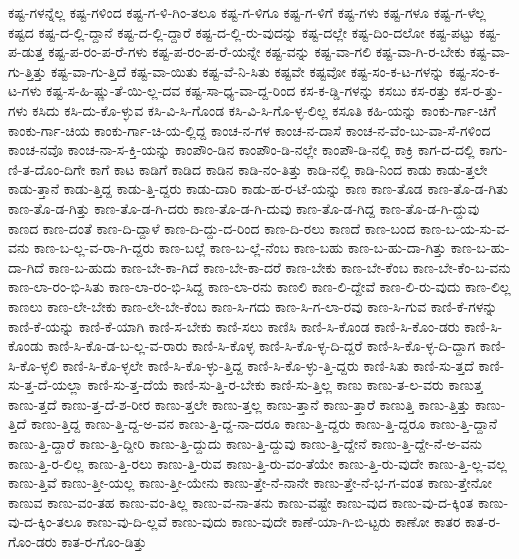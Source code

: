 {ಕಷ್ಟ-ಗಳನ್ನೆಲ್ಲ
ಕಷ್ಟ-ಗಳಿಂದ
ಕಷ್ಟ-ಗ-ಳಿ-ಗಿಂ-ತಲೂ
ಕಷ್ಟ-ಗ-ಳಿಗೂ
ಕಷ್ಟ-ಗ-ಳಿಗೆ
ಕಷ್ಟ-ಗಳು
ಕಷ್ಟ-ಗಳೂ
ಕಷ್ಟ-ಗ-ಳೆಲ್ಲ
ಕಷ್ಟದ
ಕಷ್ಟ-ದ-ಲ್ಲಿ-ದ್ದಾನೆ
ಕಷ್ಟ-ದ-ಲ್ಲಿ-ದ್ದಾರೆ
ಕಷ್ಟ-ದ-ಲ್ಲಿ-ರು-ವುದನ್ನು
ಕಷ್ಟ-ದಲ್ಲೇ
ಕಷ್ಟ-ದಿಂ-ದಲೋ
ಕಷ್ಟ-ಪಟ್ಟು
ಕಷ್ಟ-ಪ-ಡುತ್ತ
ಕಷ್ಟ-ಪ-ರಂ-ಪ-ರೆ-ಗಳು
ಕಷ್ಟ-ಪ-ರಂ-ಪ-ರೆ-ಯನ್ನೇ
ಕಷ್ಟ-ವನ್ನು
ಕಷ್ಟ-ವಾ-ಗಲಿ
ಕಷ್ಟ-ವಾ-ಗಿ-ರ-ಬೇಕು
ಕಷ್ಟ-ವಾ-ಗು-ತ್ತಿತ್ತು
ಕಷ್ಟ-ವಾ-ಗು-ತ್ತಿದೆ
ಕಷ್ಟ-ವಾ-ಯಿತು
ಕಷ್ಟ-ವೆ-ನಿ-ಸಿತು
ಕಷ್ಟವೇ
ಕಷ್ಟವೋ
ಕಷ್ಟ-ಸಂ-ಕ-ಟ-ಗಳನ್ನು
ಕಷ್ಟ-ಸಂ-ಕ-ಟ-ಗಳು
ಕಷ್ಟ-ಸ-ಹಿ-ಷ್ಣು-ತೆ-ಯಿ-ಲ್ಲ-ದವ
ಕಷ್ಟ-ಸಾ-ಧ್ಯ-ವಾ-ದ್ದ-ರಿಂದ
ಕಸ-ಕ-ಡ್ಡಿ-ಗಳನ್ನು
ಕಸಬು
ಕಸ-ರತ್ತು
ಕಸ-ರ-ತ್ತು-ಗಳು
ಕಸಿದು
ಕಸಿ-ದು-ಕೊ-ಳ್ಳುವ
ಕಸಿ-ವಿ-ಸಿ-ಗೊಂಡ
ಕಸಿ-ವಿ-ಸಿ-ಗೊ-ಳ್ಳ-ಲಿಲ್ಲ
ಕಸೂತಿ
ಕಹಿ-ಯನ್ನು
ಕಾಂಕು-ರ್ಗಾ-ಚಿಗೆ
ಕಾಂಕು-ರ್ಗಾ-ಚಿಯ
ಕಾಂಕು-ರ್ಗಾ-ಚಿ-ಯ-ಲ್ಲಿದ್ದ
ಕಾಂಚ-ನ-ಗಳ
ಕಾಂಚ-ನ-ದಾಸೆ
ಕಾಂಚ-ನ-ವೆಂ-ಬು-ವಾ-ಸೆ-ಗಳಿಂದ
ಕಾಂಚ-ನವೊ
ಕಾಂಚ-ನಾ-ಸ-ಕ್ತಿ-ಯನ್ನು
ಕಾಂಪೌಂ-ಡಿನ
ಕಾಂಪೌಂ-ಡಿ-ನಲ್ಲೇ
ಕಾಂಪೌ-ಡಿ-ನಲ್ಲಿ
ಕಾಕ್ರಿ
ಕಾಗ-ದ-ದಲ್ಲಿ
ಕಾಗು-ಣಿ-ತ-ದೊಂ-ದಿಗೇ
ಕಾಗೆ
ಕಾಟ
ಕಾಡಿಗೆ
ಕಾಡಿದ
ಕಾಡಿನ
ಕಾಡಿ-ನಂ-ತಿತ್ತು
ಕಾಡಿ-ನಲ್ಲಿ
ಕಾಡಿ-ನಿಂದ
ಕಾಡು
ಕಾಡು-ತ್ತಲೇ
ಕಾಡು-ತ್ತಾನೆ
ಕಾಡು-ತ್ತಿದ್ದ
ಕಾಡು-ತ್ತಿ-ದ್ದರು
ಕಾಡು-ದಾರಿ
ಕಾಡು-ಹ-ರ-ಟೆ-ಯನ್ನು
ಕಾಣ
ಕಾಣ-ತೊಡ
ಕಾಣ-ತೊ-ಡ-ಗಿತು
ಕಾಣ-ತೊ-ಡ-ಗಿತ್ತು
ಕಾಣ-ತೊ-ಡ-ಗಿ-ದರು
ಕಾಣ-ತೊ-ಡ-ಗಿ-ದುವು
ಕಾಣ-ತೊ-ಡ-ಗಿದ್ದ
ಕಾಣ-ತೊ-ಡ-ಗಿ-ದ್ದುವು
ಕಾಣದ
ಕಾಣ-ದಂತೆ
ಕಾಣ-ದಿ-ದ್ದಾಳೆ
ಕಾಣ-ದಿ-ದ್ದು-ದ-ರಿಂದ
ಕಾಣ-ದಿ-ರಲು
ಕಾಣದೆ
ಕಾಣ-ಬಂದ
ಕಾಣ-ಬ-ಯ-ಸು-ವ-ವನು
ಕಾಣ-ಬ-ಲ್ಲ-ವ-ರಾ-ಗಿ-ದ್ದರು
ಕಾಣ-ಬಲ್ಲೆ
ಕಾಣ-ಬ-ಲ್ಲೆ-ನೆಂಬ
ಕಾಣ-ಬಹು
ಕಾಣ-ಬ-ಹು-ದಾ-ಗಿತ್ತು
ಕಾಣ-ಬ-ಹು-ದಾ-ಗಿದೆ
ಕಾಣ-ಬ-ಹುದು
ಕಾಣ-ಬೇ-ಕಾ-ಗಿದೆ
ಕಾಣ-ಬೇ-ಕಾ-ದರೆ
ಕಾಣ-ಬೇಕು
ಕಾಣ-ಬೇ-ಕೆಂಬ
ಕಾಣ-ಬೇ-ಕೆಂ-ಬ-ವನು
ಕಾಣ-ಲಾ-ರಂ-ಭಿ-ಸಿತು
ಕಾಣ-ಲಾ-ರಂ-ಭಿ-ಸಿದ್ದ
ಕಾಣ-ಲಾ-ರನು
ಕಾಣಲಿ
ಕಾಣ-ಲಿ-ದ್ದೇವೆ
ಕಾಣ-ಲಿ-ರು-ವುದು
ಕಾಣ-ಲಿಲ್ಲ
ಕಾಣಲು
ಕಾಣ-ಲೇ-ಬೇಕು
ಕಾಣ-ಲೇ-ಬೇ-ಕೆಂಬ
ಕಾಣ-ಸಿ-ಗದು
ಕಾಣ-ಸಿ-ಗ-ಲಾ-ರವು
ಕಾಣ-ಸಿ-ಗುವ
ಕಾಣಿ-ಕೆ-ಗಳನ್ನು
ಕಾಣಿ-ಕೆ-ಯನ್ನು
ಕಾಣಿ-ಕೆ-ಯಾಗಿ
ಕಾಣಿ-ಸ-ಬೇಕು
ಕಾಣಿ-ಸಲು
ಕಾಣಿಸಿ
ಕಾಣಿ-ಸಿ-ಕೊಂಡ
ಕಾಣಿ-ಸಿ-ಕೊಂ-ಡರು
ಕಾಣಿ-ಸಿ-ಕೊಂಡು
ಕಾಣಿ-ಸಿ-ಕೊ-ಡ-ಬ-ಲ್ಲ-ವ-ರಾರು
ಕಾಣಿ-ಸಿ-ಕೊಳ್ಳ
ಕಾಣಿ-ಸಿ-ಕೊ-ಳ್ಳ-ದಿ-ದ್ದರೆ
ಕಾಣಿ-ಸಿ-ಕೊ-ಳ್ಳ-ದಿ-ದ್ದಾಗ
ಕಾಣಿ-ಸಿ-ಕೊ-ಳ್ಳಲಿ
ಕಾಣಿ-ಸಿ-ಕೊ-ಳ್ಳಲೇ
ಕಾಣಿ-ಸಿ-ಕೊ-ಳ್ಳು-ತ್ತಿದ್ದ
ಕಾಣಿ-ಸಿ-ಕೊ-ಳ್ಳು-ತ್ತಿ-ದ್ದರು
ಕಾಣಿ-ಸಿತು
ಕಾಣಿ-ಸು-ತ್ತದೆ
ಕಾಣಿ-ಸು-ತ್ತ-ದೆ-ಯಲ್ಲಾ
ಕಾಣಿ-ಸು-ತ್ತ-ದೆಯೆ
ಕಾಣಿ-ಸು-ತ್ತಿ-ರ-ಬೇಕು
ಕಾಣಿ-ಸು-ತ್ತಿಲ್ಲ
ಕಾಣು
ಕಾಣು-ತ-ಲ-ವರು
ಕಾಣುತ್ತ
ಕಾಣು-ತ್ತದೆ
ಕಾಣು-ತ್ತ-ದೆ-ಶ-ರೀರ
ಕಾಣು-ತ್ತಲೇ
ಕಾಣು-ತ್ತಲ್ಲ
ಕಾಣು-ತ್ತಾನೆ
ಕಾಣು-ತ್ತಾರೆ
ಕಾಣುತ್ತಿ
ಕಾಣು-ತ್ತಿತ್ತು
ಕಾಣು-ತ್ತಿದೆ
ಕಾಣು-ತ್ತಿದ್ದ
ಕಾಣು-ತ್ತಿ-ದ್ದ-ಅ-ವನ
ಕಾಣು-ತ್ತಿ-ದ್ದ-ನಾ-ದರೂ
ಕಾಣು-ತ್ತಿ-ದ್ದರು
ಕಾಣು-ತ್ತಿ-ದ್ದರೂ
ಕಾಣು-ತ್ತಿ-ದ್ದಾನೆ
ಕಾಣು-ತ್ತಿ-ದ್ದಾರೆ
ಕಾಣು-ತ್ತಿ-ದ್ದೀರಿ
ಕಾಣು-ತ್ತಿ-ದ್ದುದು
ಕಾಣು-ತ್ತಿ-ದ್ದುವು
ಕಾಣು-ತ್ತಿ-ದ್ದೇನೆ
ಕಾಣು-ತ್ತಿ-ದ್ದೇ-ನೆ-ಅ-ವನು
ಕಾಣು-ತ್ತಿ-ರ-ಲಿಲ್ಲ
ಕಾಣು-ತ್ತಿ-ರಲು
ಕಾಣು-ತ್ತಿ-ರುವ
ಕಾಣು-ತ್ತಿ-ರು-ವಂ-ತೆಯೇ
ಕಾಣು-ತ್ತಿ-ರು-ವುದೇ
ಕಾಣು-ತ್ತಿ-ಲ್ಲ-ವಲ್ಲ
ಕಾಣು-ತ್ತಿವೆ
ಕಾಣು-ತ್ತೀ-ಯಲ್ಲ
ಕಾಣು-ತ್ತೀ-ಯೇನು
ಕಾಣು-ತ್ತೇ-ನೆ-ನಾನೇ
ಕಾಣು-ತ್ತೇ-ನೆ-ಭ-ಗ-ವಂತ
ಕಾಣು-ತ್ತೇನೋ
ಕಾಣುವ
ಕಾಣು-ವಂ-ತಹ
ಕಾಣು-ವಂ-ತಿಲ್ಲ
ಕಾಣು-ವ-ನಾ-ತನು
ಕಾಣು-ವಷ್ಟೇ
ಕಾಣು-ವುದ
ಕಾಣು-ವು-ದ-ಕ್ಕಿಂತ
ಕಾಣು-ವು-ದ-ಕ್ಕಿಂ-ತಲೂ
ಕಾಣು-ವು-ದಿ-ಲ್ಲವೆ
ಕಾಣು-ವುದು
ಕಾಣು-ವುದೇ
ಕಾಣೆ-ಯಾ-ಗಿ-ಬಿ-ಟ್ಟರು
ಕಾಣೋ
ಕಾತರ
ಕಾತ-ರ-ಗೊಂ-ಡರು
ಕಾತ-ರ-ಗೊಂ-ಡಿತ್ತು
}
